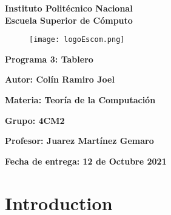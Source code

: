 \documentclass{article}
\begin{document}
	\begin{titlepage}
		\begin{center}
			{\huge\textbf{Instituto Politécnico Nacional}}\\
			\vspace{7mm}
			{\huge\textbf{Escuela Superior de Cómputo}}\\			
			\begin{figure}[h]
				\centering
				\texttt{[image: logoEscom.png]}
			\end{figure}	
			\vspace{1cm}
			{\huge\textbf{Programa 3: Tablero}}
			\par\vspace{2cm}
			\large\textbf{Autor: Colín Ramiro Joel}
			\par\vspace{1cm}
			{\large\textbf{Materia: Teoría de la Computación}}
			\par\vspace{1cm}
			{\large\textbf{Grupo: 4CM2}}
			\par\vspace{1cm}
			{\large\textbf{Profesor: Juarez Martínez Gemaro}}
			\par\vspace{1cm}
			{\large\textbf{Fecha de entrega: {\huge{12 de Octubre 2021}}}}
			\par\vspace{3cm}
		\end{center}
	\end{titlepage}
	
	
	
	
	\section*{Introduction}
\end{document}
